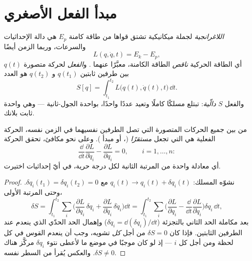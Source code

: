 \section{مبدأ الفعل الأصغري}

\begin{definition}\label{def:b3:lagrangian-mechanics:action}
\emph{اللاغرانجية} لجملة ميكانيكية تشتق قواها من طاقة كامنة $E_p$
هي دالة الإحداثيات والسرعات، وربما الزمن أيضًا
\[
L(q, \dot q, t) = E_k - E_p ,
\]
أي الطاقة الحركية \emph{ناقص} الطاقة الكامنة، معبَّرًا عنهما
. و\emph{الفعل} لحركة متصورة $q(t)$ بين طرفين
ثابتين $q(t_1)$ و $q(t_2)$ هو العدد
\[
S[q] = \int_{t_1}^{t_2} L\big(q(t), \dot q(t), t\big)\,\dd t .
\]
والفعل $S$ \emph{دالّية}: تبتلع مسلكًا كاملًا وتعيد عددًا واحدًا،
بواحدة الجول-ثانية --- وهي واحدة ثابت بلانك.
\end{definition}

\begin{theorem}\label{thm:b3:lagrangian-mechanics:euler-lagrange}
من بين جميع الحركات المتصورة التي تصل الطرفين نفسيهما في الزمن
نفسه، الحركة الفعلية هي التي تجعل  \emph{مستقرًا}
(\emph{}، أو مبدأ \emph{}). وعلى نحو
مكافئ، تحقق الحركة \emph{}
\[
\frac{\dd}{\dd t}\frac{\partial L}{\partial\dot q_i}
 - \frac{\partial L}{\partial q_i} = 0 ,
\qquad i = 1, \dots, n :
\]
أي معادلة واحدة من المرتبة الثانية لكل درجة حرية، في أيّ إحداثيات
اختيرت.
\end{theorem}

\begin{proof}
نشوّه المسلك: $q_i(t) \to q_i(t) + \delta q_i(t)$ مع
$\delta q_i(t_1) = \delta q_i(t_2) = 0$. وحتى المرتبة الأولى،
\[
\delta S = \int_{t_1}^{t_2}\sum_i\Big(
  \frac{\partial L}{\partial q_i}\,\delta q_i
 + \frac{\partial L}{\partial\dot q_i}\,\delta\dot q_i\Big)\dd t
 = \int_{t_1}^{t_2}\sum_i\Big(
  \frac{\partial L}{\partial q_i}
 - \frac{\dd}{\dd t}\frac{\partial L}{\partial\dot q_i}\Big)\delta q_i\,\dd t ,
\]
بعد مكاملة الحد الثاني بالتجزئة ($\delta\dot q_i =
\dd(\delta q_i)/\dd t$) وإهمال الحد الحدّي الذي ينعدم عند الطرفين
الثابتين. فإذا كان $\delta S = 0$ من أجل \emph{كل} تشويه، وجب أن
ينعدم القوس في كل لحظة ومن أجل كل $i$ --- إذ لو كان موجبًا في
موضع ما لأعطى نتوء $\delta q_i$ مركَّز هناك $\delta S \neq 0$.
والعكس يُقرأ من السطر نفسه.
\end{proof}

